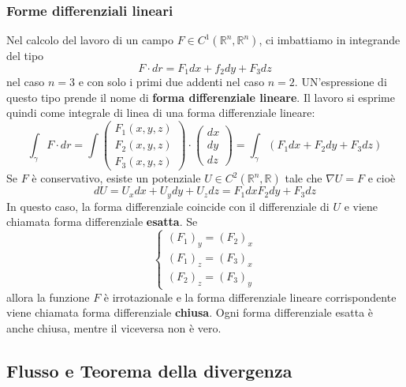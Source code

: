 \subsubsection{Forme differenziali lineari}
Nel calcolo del lavoro di un campo $F \in C^1 (\mathbb{R}^n, \mathbb{R}^n)$, ci imbattiamo in integrande del tipo
\[
    F \cdot  dr = F_1 dx + f_2 dy + F_3 dz
\]
nel caso $n=3$ e con solo i primi due addenti nel caso $n=2$. UN'espressione di questo tipo prende il nome di \textbf{forma differenziale lineare}. Il lavoro si esprime quindi come integrale di linea di una forma differenziale lineare:
\[
    \int_\gamma F \cdot dr = \int\left(\begin{matrix}
        F_1(x,y,z)\\
        F_2(x,y,z)\\
        F_3(x,y,z)
    \end{matrix}\right) \cdot \left(\begin{matrix}
        dx\\dy\\dz
    \end{matrix}\right) = \int_\gamma (F_1 dx + F_2 dy + F_3 dz)
\] 
\newline
Se $F$ è conservativo, esiste un potenziale $U \in C^2(\mathbb{R}^n, \mathbb{R})$ tale che $\nabla U = F$ e cioè
\[
    dU = U_x dx + U_y dy + U_z dz = F_1 dx F_2 dy + F_3 dz
\]
In questo caso, la forma differenziale coincide con il differenziale di $U$ e viene chiamata forma differenziale \textbf{esatta}.\newline
\newline
Se 
\[
    \begin{cases}
        (F_1)_y =(F_2)_x\\
        (F_1)_z =(F_3)_x\\
        (F_2)_z =(F_3)_y
    \end{cases}
\]
allora la funzione $F$ è irrotazionale e la forma differenziale lineare corrispondente viene chiamata forma differenziale \textbf{chiusa}.\newline
\newline
Ogni forma differenziale esatta è anche chiusa, mentre il viceversa non è vero.
\subsection{Flusso e Teorema della divergenza}
